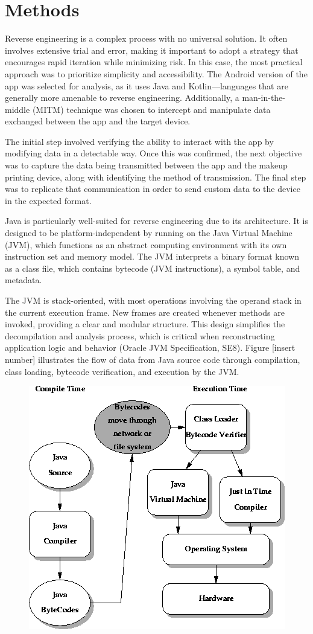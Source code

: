 \chapter{Methods}
Reverse engineering is a complex process with no universal solution. It often involves extensive trial and error, making it important to adopt a strategy that encourages rapid iteration while minimizing risk. In this case, the most practical approach was to prioritize simplicity and accessibility. The Android version of the app was selected for analysis, as it uses Java and Kotlin—languages that are generally more amenable to reverse engineering. Additionally, a man-in-the-middle (MITM) technique was chosen to intercept and manipulate data exchanged between the app and the target device.

The initial step involved verifying the ability to interact with the app by modifying data in a detectable way. Once this was confirmed, the next objective was to capture the data being transmitted between the app and the makeup printing device, along with identifying the method of transmission. The final step was to replicate that communication in order to send custom data to the device in the expected format.

Java is particularly well-suited for reverse engineering due to its architecture. It is designed to be platform-independent by running on the Java Virtual Machine (JVM), which functions as an abstract computing environment with its own instruction set and memory model. The JVM interprets a binary format known as a class file, which contains bytecode (JVM instructions), a symbol table, and metadata.

The JVM is stack-oriented, with most operations involving the operand stack in the current execution frame. New frames are created whenever methods are invoked, providing a clear and modular structure. This design simplifies the decompilation and analysis process, which is critical when reconstructing application logic and behavior (Oracle JVM Specification, SE8).
Figure [insert number] illustrates the flow of data from Java source code through compilation, class loading, bytecode verification, and execution by the JVM.
\begin{figure}
	\centering
	\includegraphics[width=0.7\linewidth]{java_process.png}
	\caption{}
	\label{fig:javaprocess}
\end{figure}


